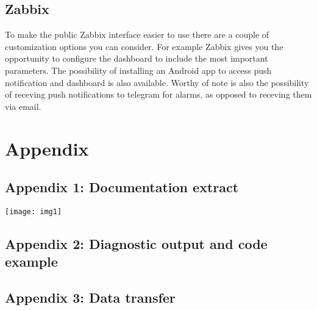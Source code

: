 \documentclass[a4paper,11pt]{scrartcl}
\begin{document}
\subsection{Zabbix}
To make the public Zabbix interface easier to use there are a couple of customization options you can consider. For example Zabbix gives you the opportunity to configure the dashboard to include the most important parameters. The possibility of installing an Android app to access push notification and dashboard is also available. Worthy of note is also the possibility of receving push notifications to telegram for alarms, as opposed to receving them via email.


\pagebreak
\section{Appendix}
\subsection{Appendix 1: Documentation extract}
\texttt{[image: img1]}
\pagebreak
\subsection{Appendix 2: Diagnostic output and code example}



\pagebreak
\subsection{Appendix 3: Data transfer}




\end{document}

